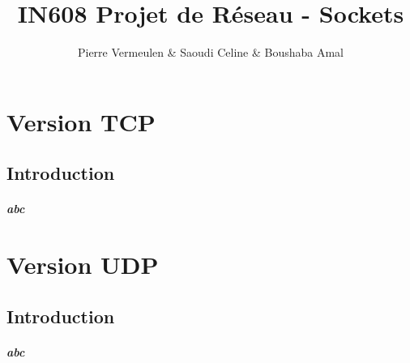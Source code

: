 \documentclass[10pt, a4paper]{report}
\title{\huge \textbf{IN608 Projet de Réseau - Sockets}}
\date{}
\author{Pierre Vermeulen \& Saoudi Celine \& Boushaba Amal }
\begin{document}
	\begin{titlingpage}
		\maketitle
	\end{titlingpage}
	
	\renewcommand\contentsname{Sommaire}
	
	\tableofcontents
	\newpage
	
	\chapter{Version TCP}
	
	\section{Introduction}
	\paragraph{
		abc
	}
	
	\chapter{Version UDP}
	\section{Introduction}
	\paragraph{
		abc
	}
\end{document}
